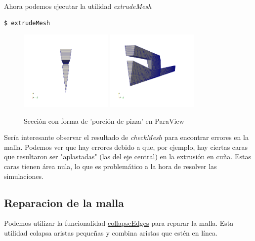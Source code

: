 \documentclass{article}
\begin{document}
Ahora podemos ejecutar la utilidad \textit{extrudeMesh}

\begin{lstlisting}
$ extrudeMesh 
\end{lstlisting}

\begin{figure}[h!]
	\centering
	\includegraphics[width=0.4\textwidth]{Figuras/02_pizza.png}
	\includegraphics[width=0.4\textwidth]{Figuras/02_pizza2.png}
	\caption{Sección con forma de 'porción de pizza' en ParaView}
	\label{fig:preliminar}
\end{figure}

Sería interesante observar el resultado de \textit{checkMesh} para encontrar errores en la malla. Podemos ver que hay errores debido a que, por ejemplo, hay ciertas caras que resultaron ser "aplastadas" (las del eje central) en la extrusión en cuña. Estas caras tienen área nula, lo que es problemático a la hora de resolver las simulaciones.

\subsection{Reparacion de la malla}
Podemos utilizar la funcionalidad \href{https://openfoamwiki.net/index.php/CollapseEdges}{collapseEdges} para reparar la malla. Esta utilidad colapsa aristas pequeñas y combina aristas que estén en línea.
\end{document}
